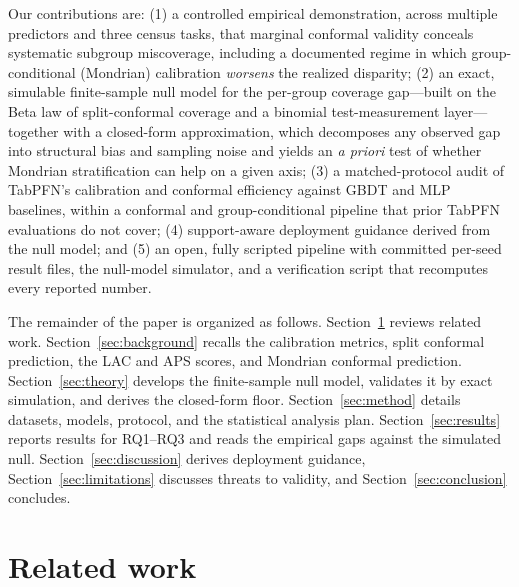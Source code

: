 \documentclass[review,12pt]{elsarticle}
\begin{document}
\noindent Our contributions are: (1) a controlled empirical demonstration, across multiple predictors and three census tasks, that marginal conformal validity conceals systematic subgroup miscoverage, including a documented regime in which group-conditional (Mondrian) calibration \emph{worsens} the realized disparity; (2) an exact, simulable finite-sample null model for the per-group coverage gap---built on the Beta law of split-conformal coverage and a binomial test-measurement layer---together with a closed-form approximation, which decomposes any observed gap into structural bias and sampling noise and yields an \emph{a priori} test of whether Mondrian stratification can help on a given axis; (3) a matched-protocol audit of TabPFN's calibration and conformal efficiency against GBDT and MLP baselines, within a conformal and group-conditional pipeline that prior TabPFN evaluations \cite{tabpfn2025,mcelfresh2023} do not cover; (4) support-aware deployment guidance derived from the null model; and (5) an open, fully scripted pipeline with committed per-seed result files, the null-model simulator, and a verification script that recomputes every reported number.

The remainder of the paper is organized as follows. Section~\ref{sec:related} reviews related work. Section~\ref{sec:background} recalls the calibration metrics, split conformal prediction, the LAC and APS scores, and Mondrian conformal prediction. Section~\ref{sec:theory} develops the finite-sample null model, validates it by exact simulation, and derives the closed-form floor. Section~\ref{sec:method} details datasets, models, protocol, and the statistical analysis plan. Section~\ref{sec:results} reports results for RQ1--RQ3 and reads the empirical gaps against the simulated null. Section~\ref{sec:discussion} derives deployment guidance, Section~\ref{sec:limitations} discusses threats to validity, and Section~\ref{sec:conclusion} concludes.

\section{Related work}
\label{sec:related}
\end{document}
